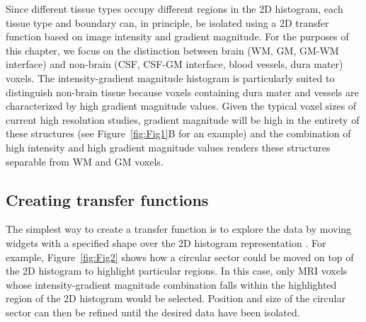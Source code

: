 Since different tissue types occupy different regions in the 2D histogram, each tissue type and boundary can, in principle, be isolated using a 2D transfer function based on image intensity and gradient magnitude. For the purposes of this chapter, we focus on the distinction between brain (WM, GM, GM-WM interface) and non-brain (CSF, CSF-GM interface, blood vessels, dura mater) voxels. The intensity-gradient magnitude histogram is particularly suited to distinguish non-brain tissue because voxels containing dura mater and vessels are characterized by high gradient magnitude values. Given the typical voxel sizes of current high resolution studies, gradient magnitude will be high in the entirety of these structures (see Figure~\ref{fig:Fig1}B for an example) and the combination of high intensity and high gradient magnitude values renders these structures separable from WM and GM voxels.

\subsection{Creating transfer functions}
The simplest way to create a transfer function is to explore the data by moving widgets with a specified shape over the 2D histogram representation \parencite{Kniss2005}. For example, Figure~\ref{fig:Fig2} shows how a circular sector could be moved on top of the 2D histogram to highlight particular regions. In this case, only MRI voxels whose intensity-gradient magnitude combination falls within the highlighted region of the 2D histogram would be selected. Position and size of the circular sector can then be refined until the desired data have been isolated.

